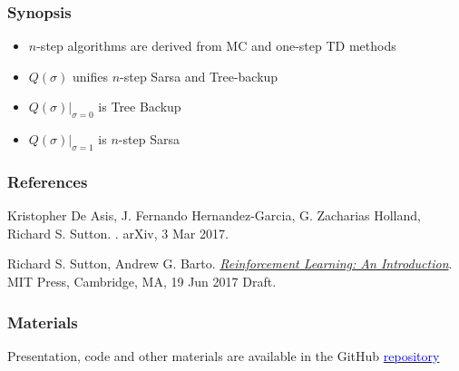 \documentclass{beamer}
\begin{document}
\begin{frame}
  \frametitle{Synopsis}
  \begin{itemize}
    \item $n$-step algorithms are derived from MC and one-step TD methods
    \item $Q(\sigma)$ unifies $n$-step Sarsa and Tree-backup
    \item $Q(\sigma)|_{\sigma=0}$ is Tree Backup
    \item $Q(\sigma)|_{\sigma=1}$ is $n$-step Sarsa
  \end{itemize}
\end{frame}

\begin{frame}
  \frametitle<presentation>{References}

  \begin{thebibliography}{10}

  \beamertemplatebookbibitems

  \beamertemplatearticlebibitems

    Kristopher De Asis, J. Fernando Hernandez-Garcia, G. Zacharias Holland,
    Richard S. Sutton.
    .
    \newblock arXiv, 3 Mar 2017.

   Richard S. Sutton, Andrew G. Barto.
    \newblock
    {\href{http://incompleteideas.net/sutton/book/the-book-2nd.html}{\em
      Reinforcement Learning: An Introduction}}.
    \newblock MIT Press, Cambridge, MA, 19 Jun 2017 Draft.

  \end{thebibliography}
\end{frame}


\begin{frame}
  \frametitle{Materials}
  \begin{center}
  Presentation, code and other materials are available in the GitHub
  \href{https://github.com/omtcyfz/talks/tree/master/n-step-q-sigma}{
    \textcolor{blue}{repository}}
  \end{center}
\end{frame}

\end{document}
